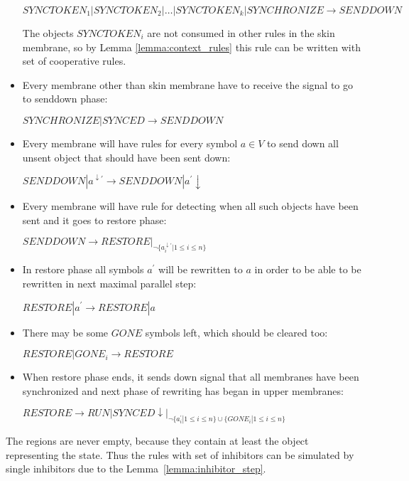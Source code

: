 \begin{dokaz}
\begin{itemize}
    $SYNCTOKEN_1|SYNCTOKEN_2|\dots|SYNCTOKEN_k|SYNCHRONIZE \rightarrow SENDDOWN$

    The objects $SYNCTOKEN_i$ are not consumed in other rules in the skin membrane, so by Lemma \ref{lemma:context_rules} this rule can be written with set of cooperative rules.

    \item Every membrane other than skin membrane have to receive the signal to go to senddown phase:

    $SYNCHRONIZE|SYNCED \rightarrow SENDDOWN$

    \item Every membrane will have rules for every symbol $a\in V$ to send down all unsent object that should have been sent down:

    $SENDDOWN|a^{\downarrow\prime} \rightarrow SENDDOWN|a^{\prime}\downarrow$

    \item Every membrane will have rule for detecting when all such objects have been sent and it goes to restore phase:

    $SENDDOWN \rightarrow RESTORE|_{\neg \{a_i^{\downarrow\prime}|1\leq i\leq n\}}$

    \item In restore phase all symbols $a^{\prime}$ will be rewritten to $a$ in order to be able to be rewritten in next maximal parallel step:

    $RESTORE|a^{\prime} \rightarrow RESTORE|a$

    \item There may be some $GONE$ symbols left, which should be cleared too:

    $RESTORE|GONE_i \rightarrow RESTORE$

    \item When restore phase ends, it sends down signal that all membranes have been synchronized and next phase of rewriting has began in upper membranes:

    $RESTORE \rightarrow RUN|SYNCED\downarrow|_{\neg \{a_i^{\prime}|1\leq i\leq n\}\cup\{GONE_i|1\leq i\leq n\}}$
  \end{itemize}


  The regions are never empty, because they contain at least the object representing the state. Thus the rules with set of inhibitors can be simulated by single inhibitors due to the Lemma~\ref{lemma:inhibitor_step}.
\end{dokaz}

